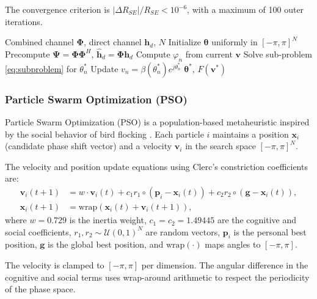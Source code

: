 \documentclass[12pt,a4paper]{article}
\newcommand{\vect}[1]{\boldsymbol{#1}}
\newcommand{\mat}[1]{\mathbf{#1}}
\begin{document}
The convergence criterion is $|\Delta R_{SE}| / R_{SE} < 10^{-6}$, with a maximum of 100 outer iterations.

\begin{algorithm}[htbp]
\caption{Alternating Optimization (AO)}
\label{alg:ao}
\begin{algorithmic}[1]
    \REQUIRE Combined channel $\mat{\Phi}$, direct channel $\mat{h}_d$, $N$
    \STATE Initialize $\vect{\theta}$ uniformly in $[-\pi, \pi]^N$
    \STATE Precompute $\mat{\Psi} = \mat{\Phi}\mat{\Phi}^H$, $\hat{\mat{h}}_d = \mat{\Phi}\mat{h}_d$
    \REPEAT
            \STATE Compute $\varphi_n$ from current $\vect{v}$
            \STATE Solve sub-problem \eqref{eq:subproblem} for $\theta_n^*$
            \STATE Update $v_n = \beta(\theta_n^*) e^{j\theta_n^*}$
        \ENDFOR
    \RETURN $\vect{\theta}^*$, $F(\vect{v}^*)$
\end{algorithmic}
\end{algorithm}

\subsubsection{Particle Swarm Optimization (PSO)}
\label{sec:pso}

Particle Swarm Optimization (PSO) is a population-based metaheuristic inspired by the social behavior of bird flocking \cite{kennedy1995particle}. Each particle $i$ maintains a position $\vect{x}_i$ (candidate phase shift vector) and a velocity $\vect{v}_i$ in the search space $[-\pi, \pi]^N$.

The velocity and position update equations using Clerc's constriction coefficients \cite{clerc2002particle} are:
\begin{align}
    \vect{v}_i(t+1) &= w \cdot \vect{v}_i(t) + c_1 r_1 \circ (\vect{p}_i - \vect{x}_i(t)) + c_2 r_2 \circ (\vect{g} - \vect{x}_i(t)), \label{eq:pso_velocity} \\
    \vect{x}_i(t+1) &= \text{wrap}\left(\vect{x}_i(t) + \vect{v}_i(t+1)\right), \label{eq:pso_position}
\end{align}
where $w = 0.729$ is the inertia weight, $c_1 = c_2 = 1.49445$ are the cognitive and social coefficients, $r_1, r_2 \sim \mathcal{U}(0,1)^N$ are random vectors, $\vect{p}_i$ is the personal best position, $\vect{g}$ is the global best position, and $\text{wrap}(\cdot)$ maps angles to $[-\pi, \pi]$.

The velocity is clamped to $[-\pi, \pi]$ per dimension. The angular difference in the cognitive and social terms uses wrap-around arithmetic to respect the periodicity of the phase space.
\end{document}
